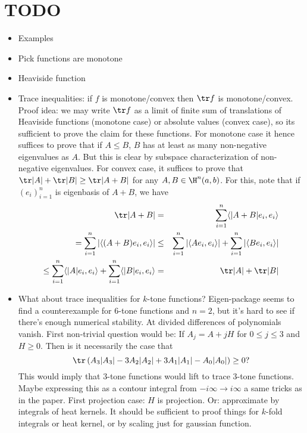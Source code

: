 \section{TODO}

\begin{itemize}
	\item Examples
	\item Pick functions are monotone
	\item Heaviside function
	\item Trace inequalities: if $f$ is monotone/convex then $\tr f$ is monotone/convex. Proof idea: we may write $\tr f$ as a limit of finite sum of translations of Heaviside functions (monotone case) or absolute values (convex case), so its sufficient to prove the claim for these functions. For monotone case it hence suffices to prove that if $A \leq B$, $B$ has at least as many non-negative eigenvalues as $A$. But this is clear by subspace characterization of non-negative eigenvalues. For convex case, it suffices to prove that $\tr |A| + \tr |B| \geq \tr |A + B|$ for any $A, B \in \H^{n}(a, b)$. For this, note that if $(e_{i})_{i = 1}^{n}$ is eigenbasis of $A + B$, we have
	\begin{eqnarray*}
		\tr |A + B| &=& \sum_{i = 1}^{n} \langle |A + B| e_{i}, e_{i} \rangle \\
		= \sum_{i = 1}^{n} \left|\langle (A + B) e_{i}, e_{i} \rangle \right| &\leq& \sum_{i = 1}^{n} \left|\langle A e_{i}, e_{i} \rangle \right| + \sum_{i = 1}^{n} \left|\langle B e_{i}, e_{i} \rangle \right| \\
		\leq \sum_{i = 1}^{n} \langle |A| e_{i}, e_{i} \rangle + \sum_{i = 1}^{n} \langle |B| e_{i}, e_{i} \rangle &=& \tr |A| + \tr |B|
	\end{eqnarray*}
	\item What about trace inequalities for $k$-tone functions? Eigen-package seems to find a counterexample for $6$-tone functions and $n = 2$, but it's hard to see if there's enough numerical stability. At divided differences of polynomials vanish. First non-trivial question would be:
	If $A_{j} = A + j H$ for $0 \leq j \leq 3$ and $H \geq 0$. Then is it necessarily the case that
	\[
		\tr \left(A_{3} |A_{3}| - 3 A_{2}|A_{2}| + 3 A_{1} |A_{1}| - A_{0} |A_{0}| \right) \geq 0?
	\]
	This would imply that $3$-tone functions would lift to trace $3$-tone functions. Maybe expressing this as a contour integral from $-i \infty \to i \infty$ a same tricks as in the paper. First projection case: $H$ is projection. Or: approximate by integrals of heat kernels. It should be sufficient to proof things for $k$-fold integrals or heat kernel, or by scaling just for gaussian function.

\end{itemize}
